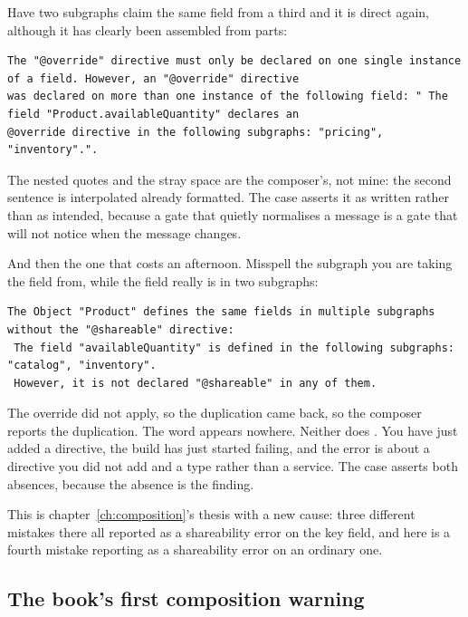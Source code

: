%
Have two subgraphs claim the same field from a third and it is direct again,
although it has clearly been assembled from parts:

\begin{verbatim}
The "@override" directive must only be declared on one single instance of a field. However, an "@override" directive
was declared on more than one instance of the following field: " The field "Product.availableQuantity" declares an
@override directive in the following subgraphs: "pricing", "inventory".".
\end{verbatim}

The nested quotes and the stray space are the composer's, not mine: the second
sentence is interpolated already formatted. The case asserts it as written
rather than as intended, because a gate that quietly normalises a message is a
gate that will not notice when the message changes.

%
And then the one that costs an afternoon. Misspell the subgraph you are taking
the field from, while the field really is in two subgraphs:

\begin{verbatim}
The Object "Product" defines the same fields in multiple subgraphs without the "@shareable" directive:
 The field "availableQuantity" is defined in the following subgraphs: "catalog", "inventory".
 However, it is not declared "@shareable" in any of them.
\end{verbatim}

The override did not apply, so the duplication came back, so the composer
reports the duplication. The word  appears nowhere. Neither does
. You have just added a directive, the build has just started
failing, and the error is about a directive you did not add and a type rather
than a service. The case asserts both absences, because the absence is the
finding.

This is chapter~\ref{ch:composition}'s thesis with a new cause: three different
mistakes there all reported as a shareability error on the key field, and here
is a fourth mistake reporting as a shareability error on an ordinary one.

\subsection*{The book's first composition warning}

